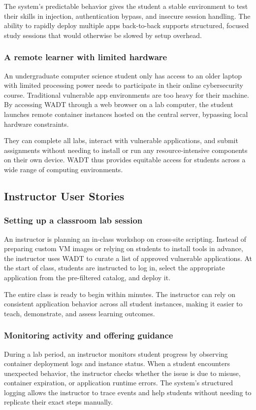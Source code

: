 \documentclass[12pt,titlepage]{article}
\begin{document}
The system’s predictable behavior gives the student a stable environment to test their skills in injection, authentication bypass, and insecure session handling. The ability to rapidly deploy multiple apps back-to-back supports structured, focused study sessions that would otherwise be slowed by setup overhead.

\subsubsection*{A remote learner with limited hardware}
An undergraduate computer science student only has access to an older laptop with limited processing power needs to participate in their online cybersecurity course. Traditional vulnerable app environments are too heavy for their machine. By accessing WADT through a web browser on a lab computer, the student launches remote container instances hosted on the central server, bypassing local hardware constraints.

They can complete all labs, interact with vulnerable applications, and submit assignments without needing to install or run any resource-intensive components on their own device. WADT thus provides equitable access for students across a wide range of computing environments.

\subsection{Instructor User Stories}

\subsubsection*{Setting up a classroom lab session}
An instructor is planning an in-class workshop on cross-site scripting. Instead of preparing custom VM images or relying on students to install tools in advance, the instructor uses WADT to curate a list of approved vulnerable applications. At the start of class, students are instructed to log in, select the appropriate application from the pre-filtered catalog, and deploy it.

The entire class is ready to begin within minutes. The instructor can rely on consistent application behavior across all student instances, making it easier to teach, demonstrate, and assess learning outcomes.

\subsubsection*{Monitoring activity and offering guidance}
During a lab period, an instructor monitors student progress by observing container deployment logs and instance status. When a student encounters unexpected behavior, the instructor checks whether the issue is due to misuse, container expiration, or application runtime errors. The system’s structured logging allows the instructor to trace events and help students without needing to replicate their exact steps manually.
\end{document}
